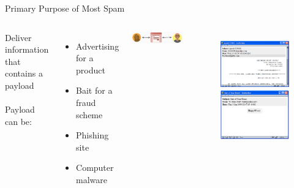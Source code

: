 \documentclass[nobackground,dvipsnames,table]{beamer}
\begin{document}
\begin{frame}{Primary Purpose of Most Spam}
    \begin{columns}
            Deliver information that contains a payload\\~\\
            Payload can be:\\
            \begin{itemize}
                \item Advertising for a product
                \item Bait for a fraud scheme
                \item Phishing site
                \item Computer malware
            \end{itemize}
            \vspace{0.1\textheight}
            \includegraphics[width=\textwidth]{spam-diagram}
            \begin{figure}
                \centering
                \includegraphics[width=\textwidth]{spam-payload-ad}
                \includegraphics[width=\textwidth]{spam-payload-exe}

\end{figure}
\end{columns}
\end{frame}
\end{document}
